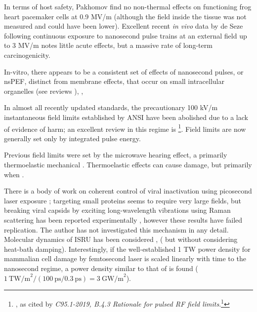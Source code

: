 \documentclass[paper.tex]{subfiles}
\begin{document}
\begin{multicols}{1}
In terms of host safety, Pakhomov \cite{Comparative} find no non-thermal effects on functioning frog heart pacemaker cells at 0.9 MV/m (although the field inside the tissue was not measured and could have been lower). Excellent recent \textit{in vivo} data by de Seze following continuous exposure to nanosecond pulse trains at an external field up to 3 MV/m \cite{Repeated2020} notes little acute effects, but a massive rate of long-term carcinogenicity. 

In-vitro, there appears to be a consistent set of effects of nanosecond pulses, or nsPEF, distinct from membrane effects, that occur on small intracellular organelles (see reviews \cite{Penetration2016c} \cite{Effects2016} ), \cite{Bioeffects}, 

In almost all recently updated standards, the precautionary 100 kV/m instantaneous field limits established by ANSI have been abolished due to a lack of evidence of harm; an excellent review in this regime is \footnote{\cite{treatyelectromagnetic}, as cited by \textit{C95.1-2019, B.4.3 Rationale for pulsed RF field limits}.\footnote{That same review also contains the following, which highlights the incredible difficulty of obtaining reliable results in this field: "Dr. de Seze also described an experiment in which two sham groups were mistakenly run and a significant difference was found. Dr. Klauenberg noted another series of experiments he reviewed where experimental treatment groups did not vary while the sham groups compared to each other did resulting in a significant difference that was otherwise meaningless."}}. Field limits are now generally set only by integrated pulse energy.

Previous field limits were set by the microwave hearing effect, a primarily thermoelastic mechanical \cite{MICROWAVEINDUCED1975}. Thermoelastic effects can cause damage, but primarily when \cite{Thermoacoustic2017}\cite{MECHANICAL1968}. \cite{Radiation1996}

There is a body of work on coherent control of viral inactivation using picosecond laser exposure \cite{Maximum2010}; targeting small proteins seems to require very large fields\cite{Picosecond2016b}, but breaking viral capsids by exciting long-wavelength vibrations using Raman scattering has been reported experimentally \cite{Inactivation2007}\cite{Prospects2012}\cite{Studies2014}, however these results have failed replication\cite{No2011}. The author has not investigated this mechanism in any detail. Molecular dynamics of ISRU has been considered \cite{Maximum2010}, (\cite{Vibrational2009} but without considering heat-bath damping). Interestingly, if the well-established 1 TW power density\cite{Targeted2002} for mammalian cell damage by femtosecond laser is scaled linearly with time to the nanosecond regime, a power density similar to that of \cite{Repeated2020} is found ($1\ \text{TW/m}^2 / (100\ \text{ps} / 0.3\ \text{ps}) = 3\ \text{GW/m}^2$). 


\end{multicols}
\end{document}
